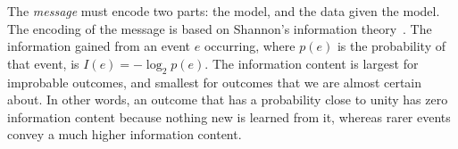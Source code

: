 \documentclass{elsarticle}
\begin{document}

The \textit{message} must encode two parts: the model, and the data given the
model. The encoding of the message is based on Shannon's information theory~\cite{shannon}. 
The information gained from an event $e$ occurring, where $p(e)$ is the
probability of that event, is $I(e) = -\log_{2}{p(e)}$. The information content
is largest for improbable outcomes, and smallest for outcomes that we are 
almost certain about. In other words, an outcome that has a probability close
to unity has zero information content because nothing new is learned from it,
whereas rarer events convey a much higher information content.


\end{document}
